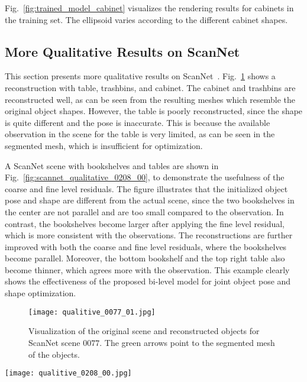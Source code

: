 Fig.~\ref{fig:trained_model_cabinet} visualizes the rendering results for cabinets in the training set. The ellipsoid varies according to the different cabinet shapes. 



\subsection*{More Qualitative Results on ScanNet}

This section presents more qualitative results on ScanNet~\cite{dai2017scannet}. 
Fig.~\ref{fig:scannet_qualitative_0077_01} shows a reconstruction with table, trashbins, and cabinet. The cabinet and trashbins are reconstructed well, as can be seen from the resulting meshes which resemble the original object shapes. However, the table is poorly reconstructed, since the shape is quite different and the pose is inaccurate. This is because the available observation in the scene for the table is very limited, as can be seen in the segmented mesh, which is insufficient for optimization. 



A ScanNet scene with bookshelves and tables are shown in Fig.~\ref{fig:scannet_qualitative_0208_00}, to demonstrate the usefulness of the coarse and fine level residuals. The figure illustrates that the initialized object pose and shape are different from the actual scene, since the two bookshelves in the center are not parallel and are too small compared to the observation. In contrast, the bookshelves become larger after applying the fine level residual, which is more consistent with the observations. The reconstructions are further improved with both the coarse and fine level residuals, where the bookshelves become parallel. Moreover, the bottom bookshelf and the top right table also become thinner, which agrees more with the observation. 
This example clearly shows the effectiveness of the proposed bi-level model for joint object pose and shape optimization.  

\begin{figure}[thp!]
    \centering
    \texttt{[image: qualitive\_0077\_01.jpg]}
    \caption{Visualization of the original scene and reconstructed objects for ScanNet scene $0077$. The green arrows point to the segmented mesh of the objects.}
    \label{fig:scannet_qualitative_0077_01}
\end{figure}

\begin{figure*}[thp!]
    \centering
    \texttt{[image: qualitive\_0208\_00.jpg]}
    \caption{Visualization of the original scene and reconstructed objects for ScanNet scene $0208$. First row from left to right: original scene, reconstruction using initialized pose and mean categorical object shape, reconstruction using optimized pose and shape with fine level residual only, reconstruction using optimized pose and shape with both coarse and fine level residuals. Second row from left to right: original scene with bookshelves and tables highlighted in light blue and beige, the rest are reconstructions overlaid with object point clouds and added pseudo points.}
    \label{fig:scannet_qualitative_0208_00}
\end{figure*}

